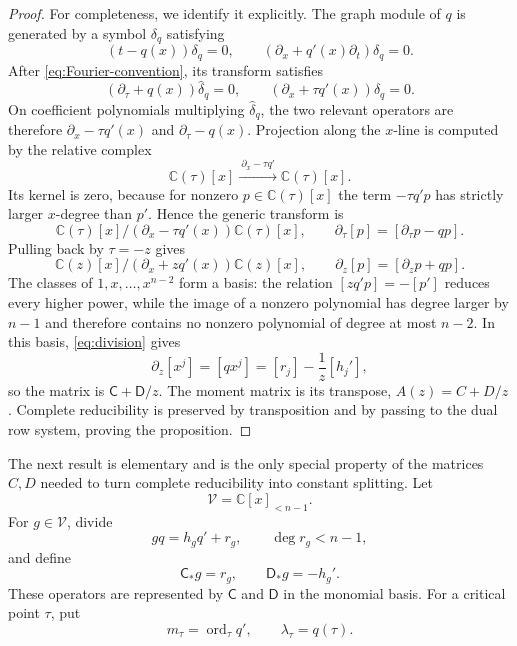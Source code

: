 \documentclass[11pt]{article}
\numberwithin{equation}{section}
\theoremstyle{definition}
\theoremstyle{remark}
\newcommand{\C}{\mathbb C}
\newcommand{\ord}{\operatorname{ord}}
\newcommand{\Vcal}{\mathscr V}
\begin{document}
\begin{proof}
For completeness, we identify it explicitly.  The graph module of $q$ is
generated by a symbol $\delta_q$ satisfying
\[
  (t-q(x))\delta_q=0,
  \qquad
  (\partial_x+q'(x)\partial_t)\delta_q=0.
\]
After \eqref{eq:Fourier-convention}, its transform satisfies
\[
  (\partial_\tau+q(x))\widehat\delta_q=0,
  \qquad
  (\partial_x+\tau q'(x))\widehat\delta_q=0.
\]
On coefficient polynomials multiplying $\widehat\delta_q$, the two relevant
operators are therefore $\partial_x-\tau q'(x)$ and
$\partial_\tau-q(x)$.  Projection along the $x$-line is computed by the
relative complex
\[
  \C(\tau)[x]
  \xrightarrow{\ \partial_x-\tau q'\ }
  \C(\tau)[x].
\]
Its kernel is zero, because for nonzero $p\in\C(\tau)[x]$ the term
$-\tau q'p$ has strictly larger $x$-degree than $p'$.  Hence the generic
transform is
\begin{equation}\label{eq:generic-transform}
  \C(\tau)[x]\Big/
  (\partial_x-\tau q'(x))\C(\tau)[x],
  \qquad
  \partial_\tau[p]=[\partial_\tau p-qp].
\end{equation}
Pulling back by $\tau=-z$ gives
\begin{equation}\label{eq:generic-z-quotient}
  \C(z)[x]\Big/
  (\partial_x+zq'(x))\C(z)[x],
  \qquad
  \partial_z[p]=[\partial_zp+qp].
\end{equation}
The classes of $1,x,\ldots,x^{n-2}$ form a basis: the relation
$[zq'p]=-[p']$ reduces every higher power, while the image of a nonzero
polynomial has degree larger by $n-1$ and therefore contains no nonzero
polynomial of degree at most $n-2$.  In this basis, \eqref{eq:division} gives
\[
  \partial_z[x^j]=[qx^j]=[r_j]-\frac1z[h_j'],
\]
so the matrix is $\mathsf C+\mathsf D/z$.  The moment matrix is its transpose,
$A(z)=C+D/z$.  Complete reducibility is preserved by transposition and by
passing to the dual row system, proving the proposition.
\end{proof}

The next result is elementary and is the only special property of the
matrices $C,D$ needed to turn complete reducibility into constant splitting.
Let
\[
  \Vcal=\C[x]_{<n-1}.
\]
For $g\in\Vcal$, divide
\begin{equation}\label{eq:g-division}
  gq=h_gq'+r_g,
  \qquad \deg r_g<n-1,
\end{equation}
and define
\begin{equation}\label{eq:CstarDstar}
  \mathsf C_*g=r_g,
  \qquad
  \mathsf D_*g=-h_g'.
\end{equation}
These operators are represented by $\mathsf C$ and $\mathsf D$ in the
monomial basis.  For a critical point $\tau$, put
\[
  m_\tau=\ord_\tau q',
  \qquad
  \lambda_\tau=q(\tau).
\]
\end{document}
